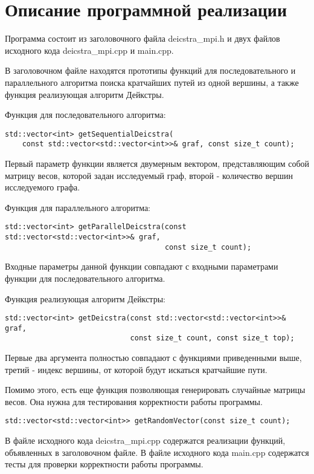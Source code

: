 \documentclass{report}
\begin{document}
\newpage

\section*{Описание программной реализации}
\par Программа состоит из заголовочного файла deicstra\_mpi.h и двух файлов исходного кода deicstra\_mpi.cpp и main.cpp.
\par В заголовочном файле находятся прототипы функций для последовательного и параллельного алгоритма поиска кратчайших путей из одной вершины, а также функция реализующая алгоритм Дейкстры.
\par Функция для последовательного алгоритма:
\begin{lstlisting}
std::vector<int> getSequentialDeicstra(
    const std::vector<std::vector<int>>& graf, const size_t count);
\end{lstlisting}
\par Первый параметр функции является двумерным вектором, представляющим собой матрицу весов, которой задан исследуемый граф, второй - количество вершин исследуемого графа.
\par Функция для параллельного алгоритма:
\begin{lstlisting}
std::vector<int> getParallelDeicstra(const std::vector<std::vector<int>>& graf,
                                     const size_t count);
\end{lstlisting}
\par Входные параметры данной функции совпадают с входными параметрами функции для последовательного алгоритма.
\par Функция реализующая алгоритм Дейкстры:
\begin{lstlisting}
std::vector<int> getDeicstra(const std::vector<std::vector<int>>& graf,
                             const size_t count, const size_t top);
\end{lstlisting}
\par Первые два аргумента полностью совпадают с функциями приведенными выше, третий - индекс вершины, от которой будут искаться кратчайшие пути.
\par Помимо этого, есть еще функция позволяющая генерировать случайные матрицы весов. Она нужна для тестирования корректности работы программы.
\begin{lstlisting}
std::vector<std::vector<int>> getRandomVector(const size_t count);
\end{lstlisting}
\par В файле исходного кода deicstra\_mpi.cpp содержатся реализации функций, объявленных в заголовочном файле. В файле исходного кода main.cpp содержатся тесты для проверки корректности работы программы.
\end{document}
